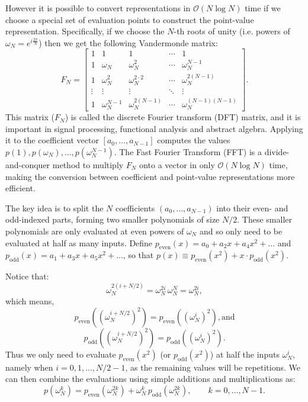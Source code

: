 \documentclass[prb,preprint]{revtex4}
\begin{document}
However it is possible to convert representations in $\mathcal{O}(N\log N)$ time if we choose a special set of evaluation points to construct the point-value representation. Specifically, if we choose the $N$-th roots of unity (i.e. powers of $\omega_N = e^{i\frac{2\pi}{N}}$) then we get the following Vandermonde matrix:
\begin{equation}
F_N =
\begin{bmatrix}
	1 & 1 & 1 & \cdots & 1 \\
	1 & \omega_N & \omega_N^2 & \cdots & \omega_N^{N-1} \\
	1 & \omega_N^2 & \omega_N^{2\cdot 2} & \cdots & \omega_N^{2(N-1)} \\
	\vdots & \vdots & \vdots & \ddots & \vdots \\
	1 & \omega_N^{N-1} & \omega_N^{2(N-1)} & \cdots & \omega_N^{(N-1)(N-1)}
\end{bmatrix}.
\end{equation}
This matrix ($F_N$) is called the discrete Fourier transform (DFT) matrix, and it is important in signal processing, functional analysis and abstract algebra. Applying it to the coefficient vector $[a_0, \ldots, a_{N-1}]$ computes the values $p(1), p(\omega_N), \ldots, p(\omega_N^{N-1})$. The Fast Fourier Transform (FFT) is a divide-and-conquer method to multiply $F_N$ onto a vector in only $\mathcal{O}(N\log N)$ time, making the conversion between coefficient and point-value representations more efficient. 

The key idea is to split the $N$ coefficients $(a_0, \ldots, a_{N-1})$ into their even- and odd-indexed parts, forming two smaller polynomials of size $N/2$. These smaller polynomials are only evaluated at even powers of $\omega_N$ and so only need to be evaluated at half as many inputs. Define $p_{\text{even}}(x) = a_0 + a_2 x + a_4 x^2 + ... $ and $p_{\text{odd}}(x) = a_1 + a_3 x + a_5 x^2 + ... $, so that $p(x) \equiv  p_{\text{even}}(x^2) + x \cdot p_{\text{odd}}(x^2)$.


Notice that:
	\begin{equation}
	\omega_N^{2(i + N/2)} = \omega_N^{2i}\,\omega_N^{N} = \omega_N^{2i},
	\end{equation}
	which means,
	\begin{equation}
	p_{\text{even}}((\omega_N^{i + N/2})^2) = p_{\text{even}}((\omega_N^i)^2), \text{and}
	\end{equation}
	\begin{equation}
	p_{\text{odd}}((\omega_N^{i + N/2})^2) = p_{\text{odd}}((\omega_N^i)^2).
	\end{equation}
	Thus we only need to evaluate $p_{\text{even}}(x^2)$ (or $p_{\text{odd}}(x^2)$) at half the inputs $\omega_N^i$, namely when $i = 0, 1, ..., N/2 -1$, as the remaining values will be repetitions. We can then combine the evaluations using simple additions and multiplications as:
	\begin{equation}
		p(\omega_N^k) = p_{\text{even}}(\omega_N^{2k}) + \omega_N^k\, p_{\text{odd}}(\omega_N^{2k}), \qquad k = 0, \ldots, N - 1.
	\end{equation}
\end{document}
